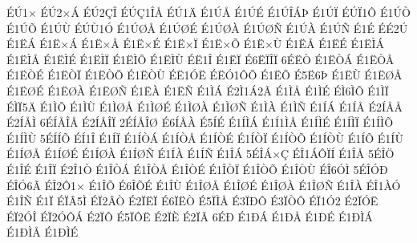 {^^c9^^da1^^d7
^^c9^^da2^^d7^^c1
^^c9^^da2^^c7^^ce
^^c9^^da^^c71^^ce^^c5
^^c9^^da1^^c4
^^c91^^da^^c5
^^c91^^da^^c9
^^c91^^da^^ce^^c1^^de
^^c91^^da^^cf
^^c9^^da^^cf1^^d4
^^c91^^da^^d2
^^c91^^da^^d5
^^c91^^da^^d9
^^c9^^da^^d91^^d3
^^c91^^da^^d8^^c5
^^c91^^da^^d8^^c9
^^c91^^da^^d8^^c0
^^c91^^da^^d8^^d1
^^c91^^da^^c0
^^c91^^da^^d1
^^c91^^c9
^^c9^^c92^^da
^^c91^^cb^^c1
^^c91^^cb^^d7^^c1
^^c91^^cb^^d7^^c5
^^c91^^cb^^d7^^c9
^^c91^^cb^^d7^^cf
^^c91^^cb^^d7^^d5
^^c91^^cb^^d7^^d9
^^c91^^cb^^c5
^^c91^^cb^^c9
^^c91^^cb^^cc^^c1
^^c91^^cb^^cc^^c5
^^c91^^cb^^cc^^c9
^^c91^^cb^^cc^^cf
^^c91^^cb^^cc^^d5
^^c91^^cb^^cc^^d9
^^c9^^cb1^^ce
^^c91^^cb^^cf
^^c96^^cb^^cf^^ce^^cf
6^^c9^^cb^^d2
^^c91^^cb^^d2^^c1
^^c91^^cb^^d2^^c5
^^c91^^cb^^d2^^c9
^^c91^^cb^^d2^^cf
^^c91^^cb^^d2^^d5
^^c91^^cb^^d2^^d9
^^c9^^cb1^^d3^^cb
^^c9^^cb^^d31^^d4^^d5
^^c91^^cb^^d5
^^c95^^cb6^^de
^^c91^^cb^^d9
^^c91^^cb^^d8^^c5
^^c91^^cb^^d8^^c9
^^c91^^cb^^d8^^c0
^^c91^^cb^^d8^^d1
^^c91^^cb^^c0
^^c91^^cb^^d1
^^c91^^cc^^c1
^^c92^^cc1^^c12^^c3
^^c91^^cc^^c5
^^c91^^cc^^c9
^^c9^^cc6^^cc^^d5
^^c91^^cc^^cf
^^c9^^cc^^cf5^^c4
^^c91^^cc^^d5
^^c91^^cc^^d9
^^c91^^cc^^d8^^c5
^^c91^^cc^^d8^^c9
^^c91^^cc^^d8^^c0
^^c91^^cc^^d8^^d1
^^c91^^cc^^c0
^^c91^^cc^^d1
^^c91^^cd^^c1
^^c91^^cd^^c5
^^c92^^cd^^c5^^c5
^^c92^^cd^^c5^^cc
6^^c9^^cd^^c5^^ce^^c5
^^c92^^cd^^c5^^ce^^cf
2^^c9^^cd^^c5^^ce^^d8
^^c96^^cd^^c5^^c0
^^c95^^cd^^c9
^^c91^^cd^^cc^^c1
^^c91^^cd1^^cc^^c5
^^c91^^cd^^cc^^c9
^^c91^^cd^^cc^^cf
^^c91^^cd^^cc^^d5
^^c91^^cd^^cc^^d9
5^^c9^^cd^^cd^^d5
^^c9^^cd1^^ce
^^c91^^cd^^cf
^^c91^^cd^^d2^^c1
^^c91^^cd^^d2^^c5
^^c91^^cd^^d2^^c9
^^c91^^cd^^d2^^cf
^^c91^^cd^^d2^^d5
^^c91^^cd^^d2^^d9
^^c91^^cd^^d5
^^c91^^cd^^d9
^^c91^^cd^^d8^^c5
^^c91^^cd^^d8^^c9
^^c91^^cd^^d8^^c0
^^c91^^cd^^d8^^d1
^^c91^^cd^^c0
^^c91^^cd^^d1
^^c91^^ce^^c1
5^^c9^^ce^^c1^^d7^^c7
^^c9^^ce1^^c1^^d4^^cf^^cd
^^c91^^ce^^c5
5^^c9^^ce^^d6
^^c91^^ce^^c9
^^c91^^ce^^cf
^^c92^^ce1^^d2
^^c91^^ce^^d2^^c1
^^c91^^ce^^d2^^c5
^^c91^^ce^^d2^^c9
^^c91^^ce^^d2^^cf
^^c91^^ce^^d2^^d5
^^c91^^ce^^d2^^d9
^^c9^^ce6^^d3^^cc
5^^c9^^ce^^d3^^d0
^^c9^^ce^^d36^^c3
^^c9^^ce2^^d41^^d7
^^c91^^ce^^d5
^^c96^^ce^^d5^^c9
^^c91^^ce^^d9
^^c91^^ce^^d8^^c5
^^c91^^ce^^d8^^c9
^^c91^^ce^^d8^^c0
^^c91^^ce^^d8^^d1
^^c91^^ce^^c0
^^c9^^ce1^^c0^^d3
^^c91^^ce^^d1
^^c91^^cf
^^c9^^cf^^c25^^cc
^^c9^^cf2^^c2^^d2
^^c92^^cf^^cb^^cf
^^c96^^cf^^cb^^d2
^^c95^^cf^^cc^^c5
^^c93^^cf^^d0^^d4
^^c93^^cf^^d2^^d4
^^c9^^cf1^^d32
^^c92^^cf^^d3^^cb
^^c9^^cf2^^d3^^ce
^^c9^^cf2^^d3^^d4^^c1
^^c92^^cf^^d4
^^c95^^cf^^d4^^cb
^^c92^^cf^^c8
^^c92^^cf^^c3
6^^c9^^d0
^^c91^^d0^^c1
^^c91^^d0^^c5
^^c91^^d0^^c9
^^c91^^d0^^cc^^c1
^^c91^^d0^^cc^^c5
^^c91^^d0^^cc^^c9
}
